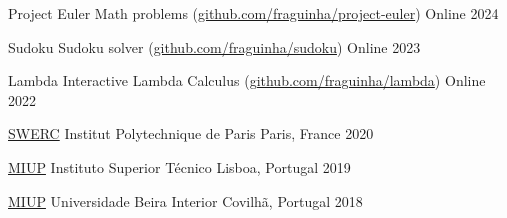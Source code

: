 




\begin{cvhonors}

\cvhonor
  {Project Euler} %
  {Math problems (\href{https://github.com/fraguinha/project-euler}{github.com/fraguinha/project-euler})} %
  {Online} %
  {2024} %

\cvhonor
  {Sudoku} %
  {Sudoku solver (\href{https://github.com/fraguinha/sudoku}{github.com/fraguinha/sudoku})} %
  {Online} %
  {2023} %

\end{cvhonors}




\begin{cvhonors}

\cvhonor
  {Lambda} %
  {Interactive Lambda Calculus (\href{https://github.com/fraguinha/lambda}{github.com/fraguinha/lambda})} %
  {Online} %
  {2022} %

\end{cvhonors}




\begin{cvhonors}

\cvhonor
  {\href{https://swerc.eu/2020/about/}{SWERC}} %
  {Institut Polytechnique de Paris} %
  {Paris, France} %
  {2020} %

\cvhonor
  {\href{https://miup19.tecnico.ulisboa.pt/}{MIUP}} %
  {Instituto Superior Técnico} %
  {Lisboa, Portugal} %
  {2019} %

\cvhonor
  {\href{https://miup.ubi.pt}{MIUP}} %
  {Universidade Beira Interior} %
  {Covilhã, Portugal} %
  {2018} %

\end{cvhonors}

